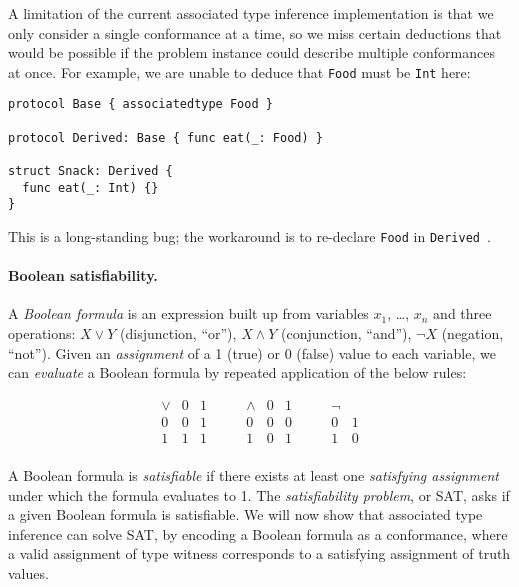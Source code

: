 \documentclass[../generics]{subfiles}
\begin{document}
\begin{example}
A limitation of the current associated type inference implementation is that we only consider a single conformance at a time, so we miss certain deductions that would be possible if the problem instance could describe multiple conformances at once. For example, we are unable to deduce that \texttt{Food} must be \texttt{Int} here:
\begin{Verbatim}
protocol Base { associatedtype Food }

protocol Derived: Base { func eat(_: Food) }

struct Snack: Derived {
  func eat(_: Int) {}
}
\end{Verbatim}
This is a long-standing bug; the workaround is to re-declare \texttt{Food} in \texttt{Derived}~\cite{sr2235}. 
\end{example}

\paragraph{Boolean satisfiability.}
A \emph{Boolean formula} is an expression built up from variables $x_1$, \ldots, $x_n$ and three operations: $X \vee Y$ (disjunction, ``or''), $X \wedge Y$ (conjunction, ``and''), $\neg X$ (negation, ``not''). Given an \emph{assignment} of a 1 (true) or 0 (false) value to each variable, we can \emph{evaluate} a Boolean formula by repeated application of the below rules:
\begin{ceqn}
\[
\begin{array}{c|cc}
\vee & 0 & 1\\
\hline
0 & 0 & 1\\
1 & 1 & 1\\
\end{array}
\qquad
\begin{array}{c|cc}
\wedge & 0 & 1\\
\hline
0 & 0 & 0\\
1 & 0 & 1\\
\end{array}
\qquad
\begin{array}{c|c}
\neg &\\
\hline
0 & 1\\
1 & 0
\end{array}
\]
\end{ceqn}
A Boolean formula is \emph{satisfiable} if there exists at least one \emph{satisfying assignment} under which the formula evaluates to 1. The \emph{satisfiability problem}, or SAT, asks if a given Boolean formula is satisfiable. We will now show that associated type inference can solve SAT, by encoding a Boolean formula as a conformance, where a valid assignment of type witness corresponds to a satisfying assignment of truth values.
\end{document}
